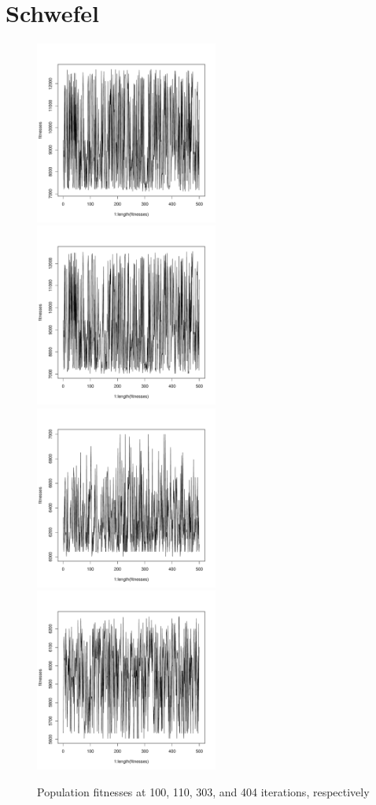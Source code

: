 \documentclass[12pt]{article}
\begin{document}
\section{Schwefel}
\begin{figure}[!h]
        \begin{center}
		\includegraphics[width=60mm]{images/schwefel.ss/ind_101.pdf}
		\includegraphics[width=60mm]{images/schwefel.ss/ind_110.pdf}
		\includegraphics[width=60mm]{images/schwefel.ss/ind_303.pdf}
		\includegraphics[width=60mm]{images/schwefel.ss/ind_404.pdf}
               	\caption{Population fitnesses at 100, 110, 303, and 404 iterations, respectively}
                \label{schwefel_ss_pop_fit}
        \end{center}
\end{figure}
\end{document}

